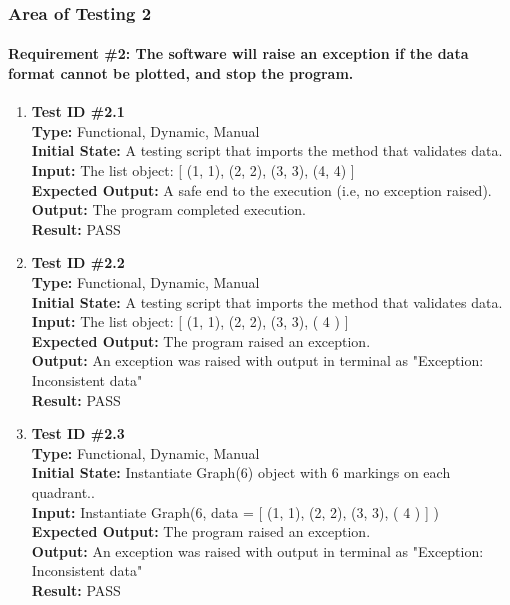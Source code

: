 \documentclass[12pt, titlepage]{article}
\begin{document}
\subsubsection{Area of Testing 2}		
	\paragraph{Requirement \#2: The software will raise an exception if the data format cannot be plotted, and stop the program.}
		\begin{enumerate}
			\item{\textbf{Test ID \#2.1\\}}
			\textbf{Type:} Functional, Dynamic, Manual\\
			\textbf{Initial State:} A testing script that imports the method that validates data. \\
			\textbf{Input:} The list object: [ (1, 1),  (2, 2), (3, 3), (4, 4) ]\\
			\textbf{Expected Output:}  A safe end to the execution (i.e, no exception raised). \\
			\textbf{Output:}	The program completed execution.\\
			\textbf{Result:} PASS
					
			\item{\textbf{Test ID \#2.2\\}}
			\textbf{Type:} Functional, Dynamic, Manual\\
			\textbf{Initial State:} A testing script that imports the method that validates data.\\
			\textbf{Input:} The list object: [ (1, 1),  (2, 2), (3, 3), ( 4 ) ]\\
			\textbf{Expected Output:} The program raised an exception.\\
			\textbf{Output:}	An exception was raised with output in terminal as "Exception: Inconsistent data"\\
			\textbf{Result:} PASS
									
			\item{\textbf{Test ID \#2.3\\}}
			\textbf{Type:} Functional, Dynamic, Manual\\
			\textbf{Initial State:} Instantiate Graph(6) object with 6 markings on each quadrant..\\
			\textbf{Input:} Instantiate Graph(6, data = [ (1, 1),  (2, 2), (3, 3), ( 4 ) ] )\\
			\textbf{Expected Output:} The program raised an exception.\\
			\textbf{Output:}	An exception was raised with output in terminal as "Exception: Inconsistent data"\\
			\textbf{Result:} PASS

	\end{enumerate}
\end{document}
